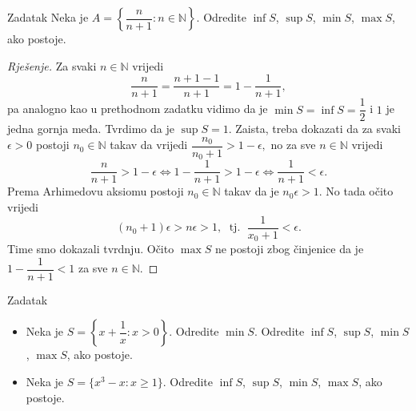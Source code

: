 \begin{exercise}{Zadatak}
Neka je \(A=\left\{\dfrac{n}{n+1} : n\in \mathbb{N}\right\}\). Odredite $\inf{S}$, $\sup{S}$, $\min{S}$, $\max{S}$, ako postoje.
\end{exercise}
\begin{proof}[Rješenje]
Za svaki \(n\in \mathbb{N}\) vrijedi
\[\dfrac{n}{n+1}=\dfrac{n+1-1}{n+1}=1-\dfrac{1}{n+1},\]
pa analogno kao u prethodnom zadatku vidimo da je $\min{S}=\inf{S}=\dfrac{1}{2}$ i $1$ je jedna gornja međa. Tvrdimo da je $\sup{S}=1$. Zaista, treba dokazati da za svaki \(\epsilon>0\) postoji \(n_0\in \mathbb{N}\) takav da vrijedi \(\dfrac{n_0}{n_0+1}>1-\epsilon,\)
no za sve $n\in \mathbb{N}$ vrijedi
\[\dfrac{n}{n+1}>1-\epsilon\Leftrightarrow 1-\dfrac{1}{n+1}>1-\epsilon\Leftrightarrow \dfrac{1}{n+1}<\epsilon.\]
Prema Arhimedovu aksiomu postoji \(n_0\in \mathbb{N}\) takav da je \(n_0\epsilon>1\). No tada očito vrijedi \[(n_0+1)\epsilon>n\epsilon>1,\;\text{ tj. }\; \dfrac{1}{x_0+1}<\epsilon.\] 
Time smo dokazali tvrdnju. Očito $\max{S}$ ne postoji zbog činjenice da je $1-\dfrac{1}{n+1}<1$ za sve $n\in \mathbb{N}$.
\end{proof}
\begin{exercise}{Zadatak} \textbf{}
\label{unboundedfirst}
\begin{itemize}
\item[a)] Neka je \(S=\left\{x+\dfrac{1}{x} : x>0\right\}\). Odredite \(\min{S}\). Odredite $\inf{S}$, $\sup{S}$, $\min{S}$, $\max{S}$, ako postoje.
\item[b)] Neka je \(S=\{x^3-x : x\geq 1\}\). Odredite $\inf{S}$, $\sup{S}$, $\min{S}$, $\max{S}$, ako postoje.
\end{itemize}
\end{exercise}
